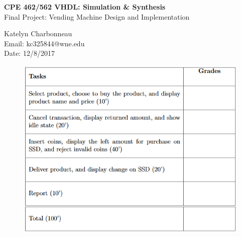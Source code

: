 \documentclass[12pt]{article}
\begin{document}
\begin{figure}[htb]
\hfil \hspace{.5in}
\end{figure}

\begin{center}
{\Large {\bf CPE 462/562 VHDL: Simulation \& Synthesis}}\\
\vspace{0.2in}
{\Large{Final Project: Vending Machine Design and Implementation}} \\
\vspace{0.2in}

Katelyn Charbonneau\\
Email: kc325844@wne.edu\\
Date: 12/8/2017\\
\end{center}

\begin{figure}[!h]
\begin{center}
\includegraphics[scale=0.8914]{grading.png}
\end{center}
\end{figure}
\end{document}
